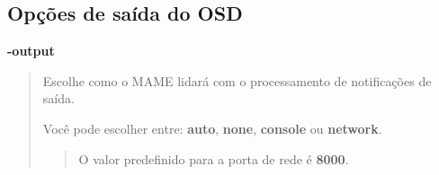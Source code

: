 \documentclass[letterpaper,10pt,brazil]{sphinxmanual}
\begin{document}
\subsection{Opções de saída do OSD}
\label{commandline/commandline-all:opcoes-de-saida-do-osd}\label{commandline/commandline-all:mame-commandline-output}
\textbf{-output}
\begin{quote}

Escolhe como o MAME lidará com o processamento de notificações de
saída.

Você pode escolher entre: \textbf{auto}, \textbf{none}, \textbf{console} ou
\textbf{network}.
\begin{quote}

O valor predefinido para a porta de rede é \textbf{8000}.
\end{quote}
\end{quote}
\end{document}
